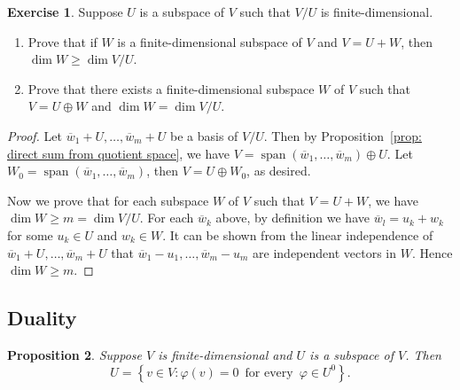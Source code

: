 \documentclass[nofonts,colorlinks]{tufte-handout}
\theoremstyle{plain} %
\newtheorem{thm}{Theorem}
\newtheorem{prop}[thm]{Proposition}
\theoremstyle{definition}
\newtheorem{exer}[thm]{Exercise}
\theoremstyle{remark}
\newcommand{\bra}[1]{\mathopen{}\left(#1\right)}
\newcommand{\cbra}[1]{\mathopen{}\left\{#1\right\}}
\renewcommand{\phi}{\varphi}
\renewcommand{\L}{\mathcal{L}}
\DeclareMathOperator{\spn}{span}
\begin{document}
\begin{exer}
	Suppose $U$ is a subspace of $V$ such that $V/U$ is finite-dimensional.
	\begin{enumerate}
		\item Prove that if $W$ is a finite-dimensional subspace of $V$ and $V=U+W$, then $\dim W\geq\dim V/U$.
		\item Prove that there exists a finite-dimensional subspace $W$ of $V$ such that $V=U\oplus W$ and $\dim W=\dim V/U$.
	\end{enumerate}
\end{exer}
\begin{proof}
	Let $\overline{w}_1+U,\dots,\overline{w}_m+U$ be a basis of $V/U$. Then by Proposition~\ref{prop: direct sum from quotient space}, we have $V=\spn(\overline{w}_1,\dots,\overline{w}_m)\oplus U$. Let $W_0=\spn(\overline{w}_1,\dots,\overline{w}_m)$, then $V=U\oplus W_0$, as desired.

	Now we prove that for each subspace $W$ of $V$ such that $V=U+W$, we have $\dim W\geq m=\dim V/U$. For each $\overline{w}_k$ above, by definition we have $\overline{w}_l=u_k+w_k$ for some $u_k\in U$ and $w_k\in W$. It can be shown from the linear independence of $\overline{w}_1+U,\dots,\overline{w}_m+U$ that $\overline{w}_1-u_1,\dots,\overline{w}_m-u_m$ are independent vectors in $W$. Hence $\dim W\geq m$.
\end{proof}


\subsection{Duality}

\begin{prop}\label{prop: relation between subspace and annihilator}
	Suppose $V$ is finite-dimensional and $U$ is a subspace of $V$. Then
	\[U=\cbra{v\in V:\phi(v)=0\,\text{ for every }\,\phi\in U^0}.\]
\end{prop}
\end{document}
